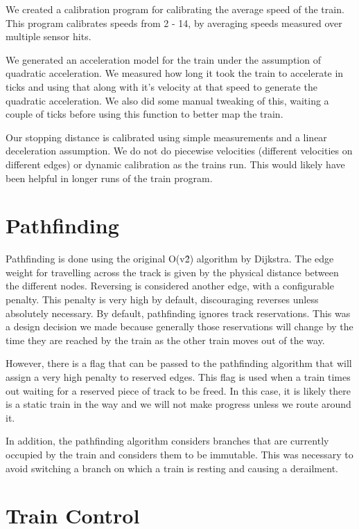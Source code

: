 \documentclass{article}
\begin{document}
We created a calibration program for calibrating the average speed of the train. This program calibrates speeds from 2 - 14, by averaging speeds measured over multiple sensor hits. 

We generated an acceleration model for the train under the assumption of quadratic acceleration. We measured how long it took the train to accelerate in ticks and using that along with it's velocity at that speed to generate the quadratic acceleration. We also did some manual tweaking of this, waiting a couple of ticks before using this function to better map the train.

Our stopping distance is calibrated using simple measurements and a linear deceleration assumption. We do not do piecewise velocities (different velocities on different edges) or dynamic calibration as the trains run. This would likely have been helpful in longer runs of the train program.

\section{Pathfinding}

Pathfinding is done using the original O(v\^2) algorithm by Dijkstra. The edge weight for travelling across the track is given by the physical distance between the different nodes. Reversing is considered another edge, with a configurable penalty. This penalty is very high by default, discouraging reverses unless absolutely necessary. By default, pathfinding ignores track reservations. This was a design decision we made because generally those reservations will change by the time they are reached by the train as the other train moves out of the way.

However, there is a flag that can be passed to the pathfinding algorithm that will assign a very high penalty to reserved edges. This flag is used when a train times out waiting for a reserved piece of track to be freed. In this case, it is likely there is a static train in the way and we will not make progress unless we route around it.

In addition, the pathfinding algorithm considers branches that are currently occupied by the train and considers them to be immutable. This was necessary to avoid switching a branch on which a train is resting and causing a derailment.

\section{Train Control}
\end{document}
